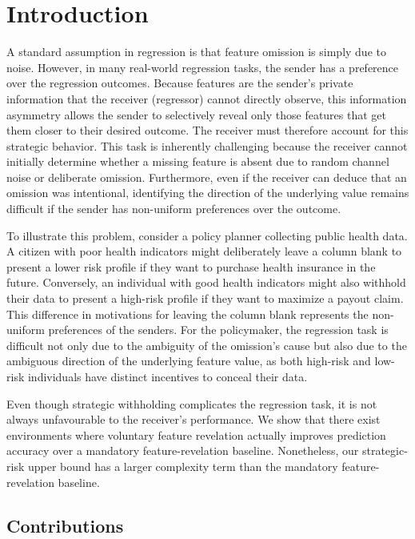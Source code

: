 \section{Introduction}

A standard assumption in regression is that feature omission is simply due to noise. However, in many real-world regression tasks, the sender has a preference over the regression outcomes. Because features are the sender's private information that the receiver (regressor) cannot directly observe, this information asymmetry allows the sender to selectively reveal only those features that get them closer to their desired outcome. The receiver must therefore account for this strategic behavior. This task is inherently challenging because the receiver cannot initially determine whether a missing feature is absent due to random channel noise or deliberate omission. Furthermore, even if the receiver can deduce that an omission was intentional, identifying the direction of the underlying value remains difficult if the sender has non-uniform preferences over the outcome.

To illustrate this problem, consider a policy planner collecting public health data. A citizen with poor health indicators might deliberately leave a column blank to present a lower risk profile if they want to purchase health insurance in the future. Conversely, an individual with good health indicators might also withhold their data to present a high-risk profile if they want to maximize a payout claim. This difference in motivations for leaving the column blank represents the non-uniform preferences of the senders. For the policymaker, the regression task is difficult not only due to the ambiguity of the omission's cause but also due to the ambiguous direction of the underlying feature value, as both high-risk and low-risk individuals have distinct incentives to conceal their data.

Even though strategic withholding complicates the regression task, it is not always unfavourable to the receiver's performance. We show that there exist environments where voluntary feature revelation actually improves prediction accuracy over a mandatory feature-revelation baseline.  
Nonetheless, our strategic-risk upper bound has a larger complexity term than the mandatory feature-revelation baseline.

\subsection{Contributions}

